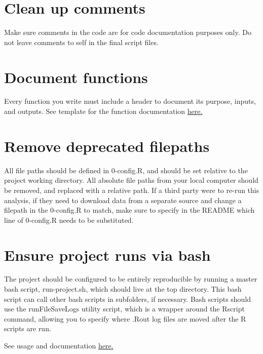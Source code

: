 \documentclass[
]{book}
\begin{document}
\section{Clean up comments}\label{clean-up-comments}

Make sure comments in the code are for code documentation purposes only. Do not leave comments to self in the final script files.

\section{Document functions}\label{document-functions}

Every function you write must include a header to document its purpose, inputs, and outputs. See template for the function documentation \href{https://jadebc.github.io/lab-manual/coding-practices.html\#function-documentation}{here.}

\section{Remove deprecated filepaths}\label{remove-deprecated-filepaths}

All file paths should be defined in 0-config.R, and should be set relative to the project working directory. All absolute file paths from your local computer should be removed, and replaced with a relative path. If a third party were to re-run this analysis, if they need to download data from a separate source and change a filepath in the 0-config.R to match, make sure to specify in the README which line of 0-config.R needs to be substituted.

\section{Ensure project runs via bash}\label{ensure-project-runs-via-bash}

The project should be configured to be entirely reproducible by running a master bash script, run-project.sh, which should live at the top directory. This bash script can call other bash scripts in subfolders, if necessary. Bash scripts should use the runFileSaveLogs utility script, which is a wrapper around the Rscript command, allowing you to specify where .Rout log files are moved after the R scripts are run.

See usage and documentation \href{https://jadebc.github.io/lab-manual/unix.html\#example-code-for-runfilesavelogs}{here.}
\end{document}
